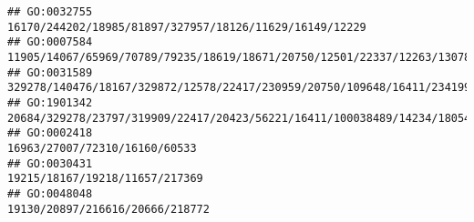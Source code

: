 \documentclass[
]{article}
\begin{document}
\begin{verbatim}
## GO:0032755                                                                                                                                                                                                                                                                                                                                                      16170/244202/18985/81897/327957/18126/11629/16149/12229
## GO:0007584                                                                                                                                                                                                                                                                                                                                      11905/14067/65969/70789/79235/18619/18671/20750/12501/22337/12263/13078
## GO:0031589                                                                                                                                                                                                                                                                                329278/140476/18167/329872/12578/22417/230959/20750/109648/16411/234199/12554/12501/78473/56838/15117/16421/11815/30060/54156
## GO:1901342                                                                                                                                                                                                                                                                                          20684/329278/23797/319909/22417/20423/56221/16411/100038489/14234/18054/20304/18053/217369/17228/106014/13078/12766
## GO:0002418                                                                                                                                                                                                                                                                                                                                                                                16963/27007/72310/16160/60533
## GO:0030431                                                                                                                                                                                                                                                                                                                                                                               19215/18167/19218/11657/217369
## GO:0048048                                                                                                                                                                                                                                                                                                                                                                              19130/20897/216616/20666/218772

\end{verbatim}
\end{document}
